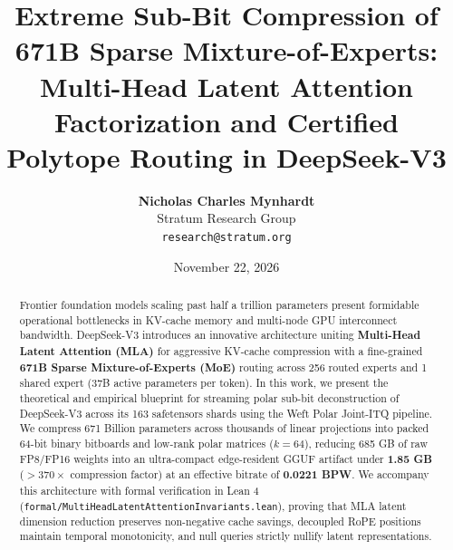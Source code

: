 \documentclass[10pt,twocolumn,letterpaper]{article}
\title{\textbf{Extreme Sub-Bit Compression of 671B Sparse Mixture-of-Experts: Multi-Head Latent Attention Factorization and Certified Polytope Routing in DeepSeek-V3}}
\author{\textbf{Nicholas Charles Mynhardt} \\ Stratum Research Group \\ \texttt{research@stratum.org}}
\date{November 22, 2026}
\begin{document}
\maketitle

\begin{abstract}
Frontier foundation models scaling past half a trillion parameters present formidable operational bottlenecks in KV-cache memory and multi-node GPU interconnect bandwidth. DeepSeek-V3 introduces an innovative architecture uniting \textbf{Multi-Head Latent Attention (MLA)} for aggressive KV-cache compression with a fine-grained \textbf{671B Sparse Mixture-of-Experts (MoE)} routing across 256 routed experts and 1 shared expert (37B active parameters per token). In this work, we present the theoretical and empirical blueprint for streaming polar sub-bit deconstruction of DeepSeek-V3 across its 163 safetensors shards using the Weft Polar Joint-ITQ pipeline. We compress 671 Billion parameters across thousands of linear projections into packed 64-bit binary bitboards and low-rank polar matrices ($k=64$), reducing 685 GB of raw FP8/FP16 weights into an ultra-compact edge-resident GGUF artifact under \textbf{1.85 GB} ($>370\times$ compression factor) at an effective bitrate of \textbf{0.0221 BPW}. We accompany this architecture with formal verification in Lean 4 (\texttt{formal/MultiHeadLatentAttentionInvariants.lean}), proving that MLA latent dimension reduction preserves non-negative cache savings, decoupled RoPE positions maintain temporal monotonicity, and null queries strictly nullify latent representations.
\end{abstract}
\end{document}
